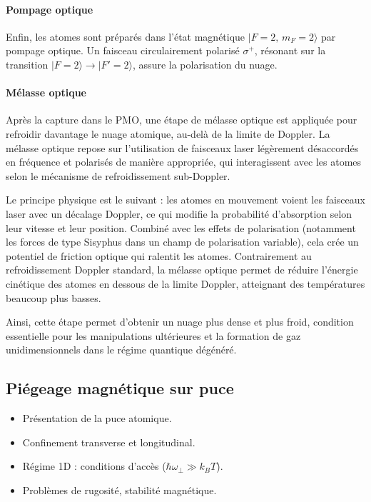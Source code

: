 \paragraph{Pompage optique}
Enfin, les atomes sont préparés dans l’état magnétique \( |F=2,\,m_F=2\rangle \) par pompage optique. Un faisceau circulairement polarisé \( \sigma^+ \), résonant sur la transition \( |F=2\rangle \rightarrow |F'=2\rangle \), assure la polarisation du nuage.

\paragraph{Mélasse optique}
Après la capture dans le PMO, une étape de mélasse optique est appliquée pour refroidir davantage le nuage atomique, au-delà de la limite de Doppler. La mélasse optique repose sur l’utilisation de faisceaux laser légèrement désaccordés en fréquence et polarisés de manière appropriée, qui interagissent avec les atomes selon le mécanisme de refroidissement sub-Doppler.

Le principe physique est le suivant : les atomes en mouvement voient les faisceaux laser avec un décalage Doppler, ce qui modifie la probabilité d’absorption selon leur vitesse et leur position. Combiné avec les effets de polarisation (notamment les forces de type Sisyphus dans un champ de polarisation variable), cela crée un potentiel de friction optique qui ralentit les atomes. Contrairement au refroidissement Doppler standard, la mélasse optique permet de réduire l’énergie cinétique des atomes en dessous de la limite Doppler, atteignant des températures beaucoup plus basses.

Ainsi, cette étape permet d’obtenir un nuage plus dense et plus froid, condition essentielle pour les manipulations ultérieures et la formation de gaz unidimensionnels dans le régime quantique dégénéré.






\subsection{Piégeage magnétique sur puce}
{\color{blue}
\begin{itemize}
    \item Présentation de la puce atomique.
    \item Confinement transverse et longitudinal.
    \item Régime 1D : conditions d’accès (\(\hbar \omega_\perp \gg k_B T\)).
    \item Problèmes de rugosité, stabilité magnétique.
\end{itemize}
}

